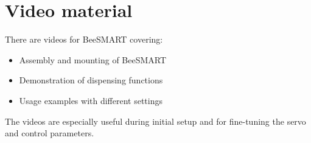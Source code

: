 \documentclass[11pt,a4paper]{article}
\begin{document}
\section{Video material}

There are videos for BeeSMART covering:

\begin{itemize}[leftmargin=*]
    \item Assembly and mounting of BeeSMART
    \item Demonstration of dispensing functions
    \item Usage examples with different settings
\end{itemize}

\vspace{2em}
The videos are especially useful during initial setup and for fine-tuning the servo and control parameters.
\vspace{2em}
\end{document}
